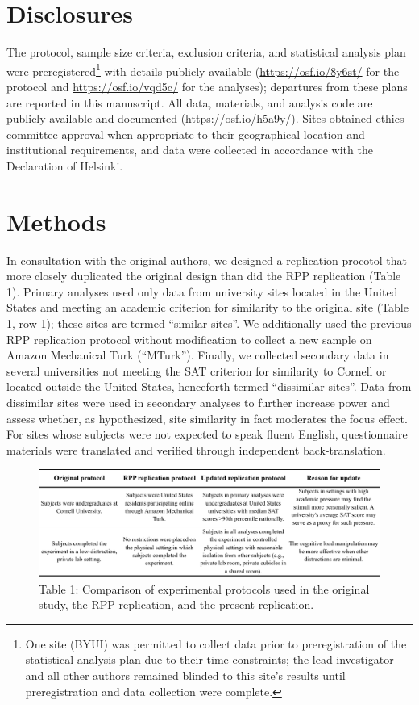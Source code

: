 \documentclass[english,floatsintext,man]{apa6}
\newcounter{author}
\theoremstyle{definition}
\theoremstyle{definition}
\theoremstyle{definition}
\theoremstyle{remark}
\begin{document}
\section{Disclosures}\label{disclosures}

The protocol, sample size criteria, exclusion criteria, and statistical
analysis plan were preregistered\footnote{One site (BYUI) was permitted
  to collect data prior to preregistration of the statistical analysis
  plan due to their time constraints; the lead investigator and all
  other authors remained blinded to this site's results until
  preregistration and data collection were complete.} with details
publicly available (\href{}{https://osf.io/8y6st/} for the protocol and
\href{}{https://osf.io/vqd5c/} for the analyses); departures from these
plans are reported in this manuscript. All data, materials, and analysis
code are publicly available and documented
(\href{}{https://osf.io/h5a9y/}). Sites obtained ethics committee
approval when appropriate to their geographical location and
institutional requirements, and data were collected in accordance with
the Declaration of Helsinki.

\section{Methods}\label{methods}

In consultation with the original authors, we designed a replication
procotol that more closely duplicated the original design than did the
RPP replication (Table 1). Primary analyses used only data from
university sites located in the United States and meeting an academic
criterion for similarity to the original site (Table 1, row 1); these
sites are termed \enquote{similar sites}. We additionally used the
previous RPP replication protocol without modification to collect a new
sample on Amazon Mechanical Turk (\enquote{MTurk}). Finally, we
collected secondary data in several universities not meeting the SAT
criterion for similarity to Cornell or located outside the United
States, henceforth termed \enquote{dissimilar sites}. Data from
dissimilar sites were used in secondary analyses to further increase
power and assess whether, as hypothesized, site similarity in fact
moderates the focus effect. For sites whose subjects were not expected
to speak fluent English, questionnaire materials were translated and
verified through independent back-translation.

\begin{figure}
\centering
\includegraphics{summary_table/table_1.png}
\caption{Table 1: Comparison of experimental protocols used in the
original study, the RPP replication, and the present replication.}
\end{figure}
\end{document}
